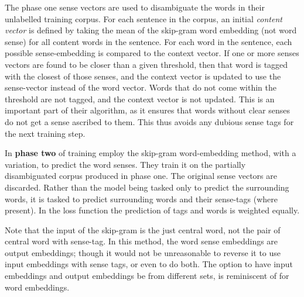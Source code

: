 \documentclass[12pt,parskip]{komatufte}
\begin{document}
The phase one sense vectors are used to disambiguate the words in their unlabelled training corpus.
For each sentence in the corpus, an initial\emph{ content vector} is defined by taking the mean of the skip-gram word embedding (not word sense) for all content words in the sentence.
For each word in the sentence, each possible sense-embedding is compared to the context vector.
If one or more senses vectors are found to be closer than a given threshold,
then that word is tagged with the closest of those senses,
 and the context vector is updated to use the sense-vector instead of the word vector.
Words that do not come within the threshold are not tagged, and the context vector is not updated.
This is an important part of their algorithm, as it ensures that words without clear senses do not get a sense ascribed to them.
This thus avoids any dubious sense tags for the next training step.

In \textbf{phase two} of training
\textcite{Chen2014} employ the skip-gram word-embedding method, with a variation, to predict the word senses.
They train it on the partially disambiguated corpus produced in phase one.
The original sense vectors are discarded.
Rather than the model being tasked only to predict the surrounding words, it is tasked to predict surrounding words and their sense-tags (where present).
In the loss function the prediction of tags and words is weighted equally.

Note that the input of the skip-gram is the just central word, not the pair of central word with sense-tag.
In this method, the word sense embeddings are output embeddings; though it would not be unreasonable to reverse it to use input embeddings with sense tags, or even to do both.
The option to have input embeddings and output embeddings be from different sets, is reminiscent of \textcite{schwenk2004efficient} for word embeddings.
\end{document}
